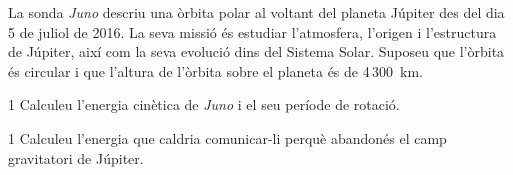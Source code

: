 La sonda \textit{Juno} descriu una òrbita polar al voltant del planeta Júpiter des del dia 5 de juliol de 2016. La seva missió és estudiar l'atmosfera, l'origen i l'estructura de Júpiter, així com la seva evolució dins del Sistema Solar. Suposeu que l'òrbita és circular i que l'altura de l'òrbita sobre el planeta és de 4\,300~km.


\begin{apartat}{1}
Calculeu l'energia cinètica de \textit{Juno} i el seu període de rotació.
\end{apartat}

\begin{apartat}{1}
Calculeu l'energia que caldria comunicar-li perquè abandonés el camp gravitatori de Júpiter.
\end{apartat}

